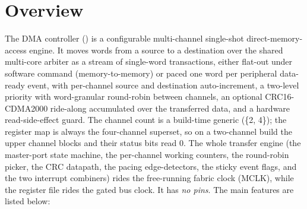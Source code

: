 \section{Overview}

The DMA controller () is a configurable multi-channel single-shot direct-memory-access engine. It moves words from a source to a destination over the shared multi-core arbiter as a stream of single-word transactions, either flat-out under software command (memory-to-memory) or paced one word per peripheral data-ready event, with per-channel source and destination auto-increment, a two-level priority with word-granular round-robin between channels, an optional \mbox{CRC16-CDMA2000} ride-along accumulated over the transferred data, and a hardware read-side-effect guard. The channel count is a build-time generic (\{2, 4\}); the register map is always the four-channel superset, so on a two-channel build the upper channel blocks and their status bits read 0. The whole transfer engine (the master-port state machine, the per-channel working counters, the round-robin picker, the CRC datapath, the pacing edge-detectors, the sticky event flags, and the two interrupt combiners) rides the free-running fabric clock (MCLK), while the register file rides the gated bus clock. It has \emph{no pins}. The main features are listed below:


